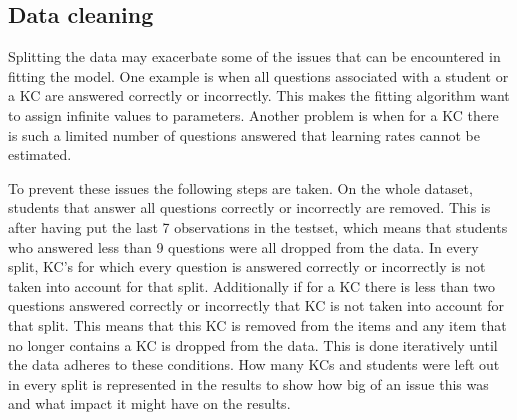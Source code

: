 \documentclass{scrartcl}
\newcommand\todo[1]{\textit{\textcolor{red}{#1}}}
\begin{document}

\subsection{Data cleaning}
\label{sec:cleaning}
Splitting the data may exacerbate some of the issues that can be encountered in fitting the model. One example is when all questions associated with a student or a KC are answered correctly or incorrectly. This makes the fitting algorithm want to assign infinite values to parameters. Another problem is when for a KC there is such a limited number of questions answered that learning rates cannot be estimated.

To prevent these issues the following steps are taken. On the whole dataset, students that answer all questions correctly or incorrectly are removed. This is after having put the last 7 observations in the testset, which means that students who answered less than 9 questions were all dropped from the data. 
In every split, KC's for which every question is answered correctly or incorrectly is not taken into account for that split. Additionally if for a KC there is less than two questions answered correctly or incorrectly that KC is not taken into account for that split. This means that this KC is removed from the items and any item that no longer contains a KC is dropped from the data. This is done iteratively until the data adheres to these conditions. How many KCs and students were left out in every split is represented in the results to show how big of an issue this was and what impact it might have on the results.
\end{document}
